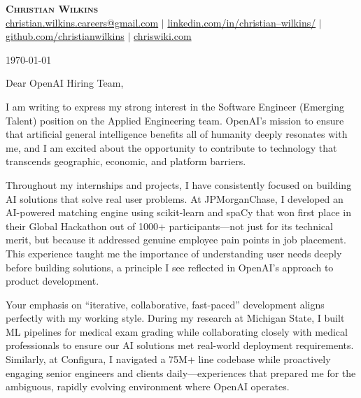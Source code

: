 \documentclass[letterpaper,11pt]{article}
\begin{document}
\begin{center}
    \textbf{\Huge \scshape Christian Wilkins} \\ \vspace{1pt}
    \small \href{mailto:christian.wilkins.careers@gmail.com}{christian.wilkins.careers@gmail.com} $|$
    \href{https://www.linkedin.com/in/christian--wilkins/}{linkedin.com/in/christian--wilkins/} $|$
    \href{https://github.com/christianwilkins}{github.com/christianwilkins} $|$
    \href{https://chriswiki.com/}{chriswiki.com}
\end{center}

\vspace{0.7in}

\noindent
\today

\vspace{0.5in}

\noindent
Dear OpenAI Hiring Team,

\vspace{0.4in}

I am writing to express my strong interest in the Software Engineer (Emerging Talent) position on the Applied Engineering team. OpenAI's mission to ensure that artificial general intelligence benefits all of humanity deeply resonates with me, and I am excited about the opportunity to contribute to technology that transcends geographic, economic, and platform barriers.

\vspace{0.2in}

Throughout my internships and projects, I have consistently focused on building AI solutions that solve real user problems. At JPMorganChase, I developed an AI-powered matching engine using scikit-learn and spaCy that won first place in their Global Hackathon out of 1000+ participants—not just for its technical merit, but because it addressed genuine employee pain points in job placement. This experience taught me the importance of understanding user needs deeply before building solutions, a principle I see reflected in OpenAI's approach to product development.

\vspace{0.2in}

Your emphasis on ``iterative, collaborative, fast-paced'' development aligns perfectly with my working style. During my research at Michigan State, I built ML pipelines for medical exam grading while collaborating closely with medical professionals to ensure our AI solutions met real-world deployment requirements. Similarly, at Configura, I navigated a 75M+ line codebase while proactively engaging senior engineers and clients daily—experiences that prepared me for the ambiguous, rapidly evolving environment where OpenAI operates.
\end{document}
